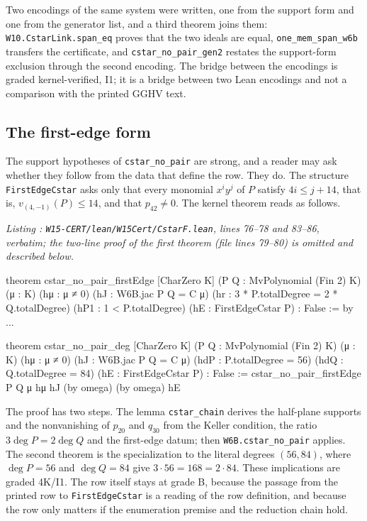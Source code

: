 \documentclass[a4paper,11pt]{article}
\newcounter{leanlisting}
\newenvironment{leanlisting}[2]{%
  \refstepcounter{leanlisting}\label{#2}%
  \begin{center}\textit{\small\color{inksecondary}Listing \theleanlisting: #1}\end{center}%
  \Verbatim[breaklines=true,breakanywhere=true,fontsize=\footnotesize,frame=single,framesep=4pt,rulecolor=\color{borderstrong},fillcolor=\color{bgsubtle}]%
}{%
  \endVerbatim%
}
\theoremstyle{jsplain}
\theoremstyle{jsdef}
\theoremstyle{jsrem}
\begin{document}
Two encodings of the same system were written, one from the support form and one from the generator list, and a third theorem joins them: \texttt{W10.\allowbreak{}CstarLink.\allowbreak{}span\_\allowbreak{}eq} proves that the two ideals are equal, \texttt{one\_\allowbreak{}mem\_\allowbreak{}span\_\allowbreak{}w6b} transfers the certificate, and \texttt{cstar\_\allowbreak{}no\_\allowbreak{}pair\_\allowbreak{}gen2} restates the support-form exclusion through the second encoding. The bridge between the encodings is graded kernel-verified, I1; it is a bridge between two Lean encodings and not a comparison with the printed GGHV text.

\subsection{The first-edge form}

The support hypotheses of \texttt{cstar\_\allowbreak{}no\_\allowbreak{}pair} are strong, and a reader may ask whether they follow from the data that define the row. They do. The structure \texttt{FirstEdgeCstar} asks only that every monomial $x^iy^j$ of $P$ satisfy $4i\le j+14$, that is, $v_{(4,-1)}(P)\le14$, and that $p_{42}\ne0$. The kernel theorem reads as follows.

\begin{leanlisting}{\texttt{W15-CERT/lean/W15Cert/CstarF.lean}, lines 76--78 and 83--86, verbatim; the two-line proof of the first theorem (file lines 79--80) is omitted and described below.}{rp:lst:cstar}
theorem cstar_no_pair_firstEdge [CharZero K] (P Q : MvPolynomial (Fin 2) K) (μ : K) (hμ : μ ≠ 0)
    (hJ : W6B.jac P Q = C μ) (hr : 3 * P.totalDegree = 2 * Q.totalDegree)
    (hP1 : 1 < P.totalDegree) (hE : FirstEdgeCstar P) : False := by
  ...

theorem cstar_no_pair_deg [CharZero K] (P Q : MvPolynomial (Fin 2) K) (μ : K) (hμ : μ ≠ 0)
    (hJ : W6B.jac P Q = C μ) (hdP : P.totalDegree = 56) (hdQ : Q.totalDegree = 84)
    (hE : FirstEdgeCstar P) : False :=
  cstar_no_pair_firstEdge P Q μ hμ hJ (by omega) (by omega) hE
\end{leanlisting}

The proof has two steps. The lemma \texttt{cstar\_\allowbreak{}chain} derives the half-plane supports and the nonvanishing of $p_{20}$ and $q_{30}$ from the Keller condition, the ratio $3\deg P=2\deg Q$ and the first-edge datum; then \texttt{W6B.\allowbreak{}cstar\_\allowbreak{}no\_\allowbreak{}pair} applies. The second theorem is the specialization to the literal degrees $(56,84)$, where $\deg P=56$ and $\deg Q=84$ give $3\cdot56=168=2\cdot84$. These implications are graded 4K/I1. The row itself stays at grade B, because the passage from the printed row to \texttt{FirstEdgeCstar} is a reading of the row definition, and because the row only matters if the enumeration premise and the reduction chain hold.
\end{document}
